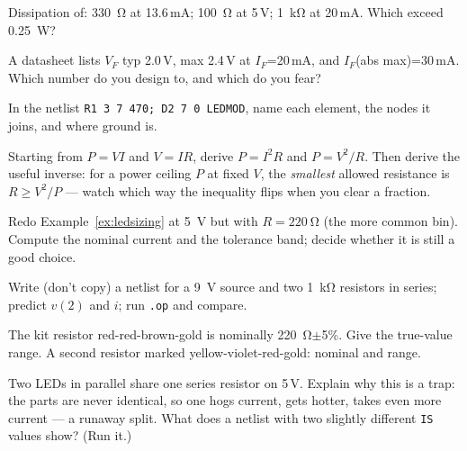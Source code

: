 \begin{exercise}[easy]
Dissipation of: \qty{330}{\ohm} at 13.6\,mA; \qty{100}{\ohm} at 5\,V;
\qty{1}{\kilo\ohm} at 20\,mA. Which exceed \qty{0.25}{\watt}?
\end{exercise}

\begin{exercise}[easy]
A datasheet lists $V_F$ typ 2.0\,V, max 2.4\,V at $I_F$=20\,mA, and
$I_F$(abs max)=30\,mA. Which number do you design to, and which do you fear?
\end{exercise}

\begin{exercise}[easy]
In the netlist \texttt{R1 3 7 470; D2 7 0 LEDMOD}, name each element, the
nodes it joins, and where ground is.
\end{exercise}

\begin{exercise}
\label{ex:derive-power}
Starting from $P=VI$ and $V=IR$, derive $P=I^2R$ and $P=V^2/R$. Then derive
the useful inverse: for a power ceiling $P$ at fixed $V$, the \emph{smallest}
allowed resistance is $R \ge V^2/P$ — watch which way the inequality flips
when you clear a fraction.
\end{exercise}

\begin{exercise}[medium]
Redo Example~\ref{ex:ledsizing} at \qty{5}{\volt} but with $R=\qty{220}{\ohm}$
(the more common bin). Compute the nominal current and the tolerance band;
decide whether it is still a good choice.
\end{exercise}

\begin{exercise}[medium]
Write (don't copy) a netlist for a \qty{9}{\volt} source and two
\qty{1}{\kilo\ohm} resistors in series; predict $v(2)$ and $i$; run
\texttt{.op} and compare.
\end{exercise}

\begin{exercise}[medium]
The kit resistor red-red-brown-gold is nominally \qty{220}{\ohm}$\pm$5\%.
Give the true-value range. A second resistor marked yellow-violet-red-gold:
nominal and range.
\end{exercise}

\begin{exercise}[hard]
Two LEDs in parallel share one series resistor on 5\,V. Explain why this is
a trap: the parts are never identical, so one hogs current, gets hotter,
takes even more current — a runaway split. What does a netlist with two
slightly different \texttt{IS} values show? (Run it.)
\end{exercise}

